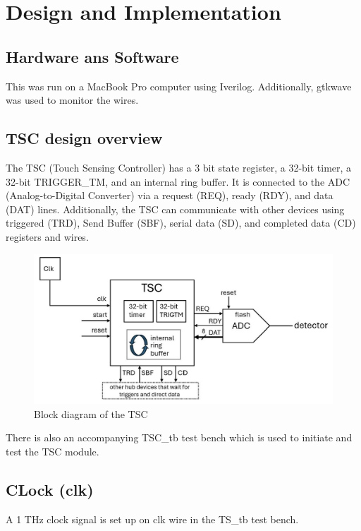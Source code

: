 \section{Design and Implementation }

\subsection{Hardware ans Software}
This was run on a MacBook Pro computer using Iverilog. Additionally, gtkwave was used to monitor the wires.

\subsection{TSC design overview}

The TSC (Touch Sensing Controller) has a 3 bit state register, a 32-bit timer,
a 32-bit TRIGGER\_TM, and an internal ring buffer.
It is connected to the ADC (Analog-to-Digital Converter)
via a request (REQ), ready (RDY), and data (DAT) lines.
Additionally, the TSC can communicate with other devices using triggered (TRD), Send Buffer (SBF),
serial data (SD), and completed data (CD) registers and wires.


\begin{figure}[H]
    \centering
    \includegraphics[width=0.8\columnwidth]{Figures/block_diagram_of_TSC}
    \caption{Block diagram of the TSC}
    \label{fig:block diagram of TSC}
\end{figure}

There is also an accompanying TSC\_tb test bench which is used to initiate and test the TSC module.

\subsection{CLock (clk)}
A 1 THz clock signal is set up on clk wire in the TS\_tb test bench.

